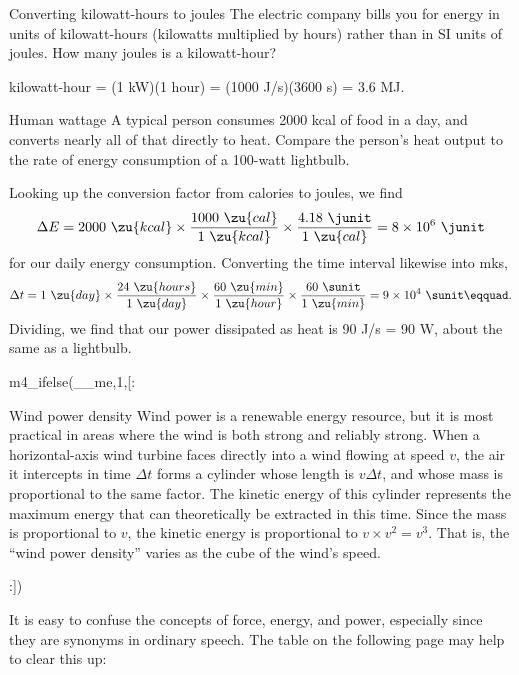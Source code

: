 \begin{eg}{Converting kilowatt-hours to joules}
\egquestion The electric company bills you for energy in units
of kilowatt-hours (kilowatts multiplied by hours) rather
than in SI units of joules. How many joules is a kilowatt-hour?

 kilowatt-hour = (1 kW)(1 hour) = (1000 J/s)(3600 s) = 3.6 MJ.
\end{eg}

\begin{eg}{Human wattage}
\egquestion A typical person consumes 2000 kcal of food in a
day, and converts nearly all of that directly to heat.
Compare the person's heat output to the rate of energy
consumption of a 100-watt lightbulb.

\eganswer Looking up the conversion factor from calories to joules, we find
\begin{equation*}
 \Delta E=2000\ \zu{kcal}\times\frac{1000\ \zu{cal}}{1\ \zu{kcal}}\times\frac{4.18\ \junit}{1\ \zu{cal}}=8\times10^6\ \junit
\end{equation*}
for our daily energy consumption. Converting the time
interval likewise into mks,
\begin{equation*}
 \Delta t=1\ \zu{day}\times\frac{24\ \zu{hours}}{1\ \zu{day}}\times\frac{60\ \zu{min}}{1\ \zu{hour}}\times\frac{60\ \sunit}{1\ \zu{min}}=9\times10^4\ \sunit\eqquad.
\end{equation*}
Dividing, we find that our power dissipated as heat is 90
J/s = 90 W, about the same as a lightbulb.
\end{eg}

m4_ifelse(__me,1,[:\begin{eg}{Wind power density}\label{eg:wind-power-density}
Wind power is a renewable energy resource, but it is most practical in areas where the
wind is both strong and reliably strong. When a horizontal-axis wind turbine faces
directly into a wind flowing at speed $v$, the air it intercepts in time $\Delta t$
forms a cylinder whose length is $v\Delta t$, and whose mass is proportional to the same
factor. The kinetic energy of this cylinder represents the maximum energy that can theoretically
be extracted in this time. Since the mass is proportional to $v$, the kinetic energy is proportional
to $v\times v^2=v^3$. That is, the ``wind power density'' varies as the cube of the wind's speed.
\end{eg}:])

It is easy to confuse the concepts of force, energy, and
power, especially since they are synonyms in ordinary
speech. The table on the following page may help to clear this up:

